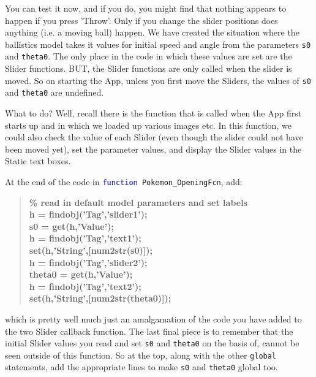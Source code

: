 \documentclass{tufte-book} %
\newenvironment{docspecbold}{\begin{quotation}\ttfamily\bfseries\parskip0pt\parindent0pt\ignorespaces}{\end{quotation}}
\begin{document}
You can test it now, and if you do, you might find that nothing appears to happen if you press 'Throw'. Only if you change the slider positions does anything (i.e. a moving ball) happen. We have created the situation where the ballistics model takes it values for initial speed and angle from the parameters \texttt{s0} and \texttt{theta0}. The only place in the code in which these values are set are the \textsf{Slider} functions. BUT, the \textsf{Slider} functions are only called when the slider is moved. So on starting the App, unless you first move the \textsf{Sliders}, the values of \texttt{s0} and \texttt{theta0} are undefined.

What to do? Well, recall there is the function that is called when the App first starts up and in which we loaded up various images etc. In this function, we could also check the value of each \textsf{Slider} (even though the slider could not have been moved yet), set the parameter values, and display the \textsf{Slider} values in the \textsf{Static text} boxes.

At the end of the code in \texttt{\textcolor{blue}{function} Pokemon\_OpeningFcn}, add:
\begin{docspecbold}
\textcolor[rgb]{0,0.501961,0}{\% read in default model parameters and set labels}
\\h = findobj(\textcolor[rgb]{0.501961,0,1}{'Tag'},\textcolor[rgb]{0.501961,0,1}{'slider1'});
\\s0 = get(h,\textcolor[rgb]{0.501961,0,1}{'Value'});
\\h = findobj(\textcolor[rgb]{0.501961,0,1}{'Tag'},\textcolor[rgb]{0.501961,0,1}{'text1'});
\\set(h,\textcolor[rgb]{0.501961,0,1}{'String'},[num2str(s0)]);
\\h = findobj(\textcolor[rgb]{0.501961,0,1}{'Tag'},\textcolor[rgb]{0.501961,0,1}{'slider2'});
\\theta0 = get(h,\textcolor[rgb]{0.501961,0,1}{'Value'});
\\h = findobj(\textcolor[rgb]{0.501961,0,1}{'Tag'},\textcolor[rgb]{0.501961,0,1}{'text2'});
\\set(h,\textcolor[rgb]{0.501961,0,1}{'String'},[num2str(theta0)]);
\end{docspecbold}
which is pretty well much just an amalgamation of the code you have added to the two \textsf{Slider} callback function. The last final piece is to remember that the initial Slider values you read and set \texttt{s0} and \texttt{theta0} on the basis of, cannot be seen outside of this function. So at the top, along with the other \texttt{global} statements, add the appropriate lines to make \texttt{s0} and \texttt{theta0} global too.
\end{document}
